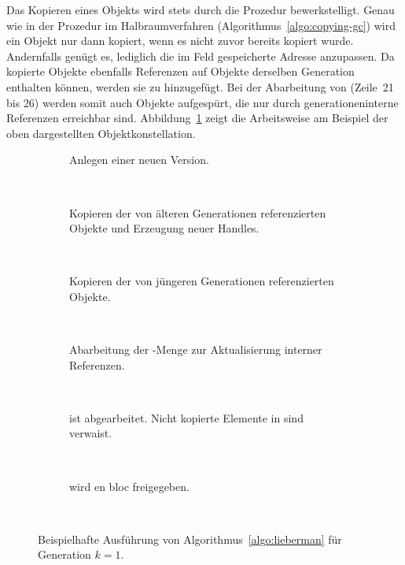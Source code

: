 Das Kopieren eines Objekts wird stets durch die Prozedur  bewerkstelligt.
Genau wie in der Prozedur  im Halbraumverfahren (Algorithmus~\ref{algo:copying-gc}) wird ein Objekt nur dann kopiert, wenn es nicht zuvor bereits kopiert wurde.
Andernfalls genügt es, lediglich die im Feld gespeicherte Adresse anzupassen.
Da kopierte Objekte ebenfalls Referenzen auf Objekte derselben Generation enthalten können, werden sie zu  hinzugefügt.
Bei der Abarbeitung von  (Zeile~21 bis 26) werden somit auch Objekte aufgespürt, die nur durch generationeninterne Referenzen erreichbar sind.
Abbildung~\ref{fig:lieberman-example} zeigt die Arbeitsweise am Beispiel der oben dargestellten Objektkonstellation.

\newpage

\begin{figure}[H] \newcommand{\liebermanscale}{0.75} \newcommand{\liebermanspace}{1cm}
	\centering
	\begin{subfigure}[t]{0.45\textwidth}
		\centering
		
		\caption{Anlegen einer neuen Version.}
	\end{subfigure}~\hspace{\liebermanspace}~
	\begin{subfigure}[t]{0.45\textwidth}
		\centering
		
		\caption{Kopieren der von älteren Generationen referenzierten Objekte und Erzeugung neuer Handles.}
	\end{subfigure}\\[1cm]
	\begin{subfigure}[t]{0.45\textwidth}
		\centering
		
		\caption{Kopieren der von jüngeren Generationen referenzierten Objekte.}
	\end{subfigure}~\hspace{\liebermanspace}~
	\begin{subfigure}[t]{0.45\textwidth}
		\centering
		
		\caption{Abarbeitung der -Menge zur Aktualisierung interner Referenzen.}
	\end{subfigure}\\[1cm]
	\begin{subfigure}[t]{0.45\textwidth}
		\centering
		
		\caption{ ist abgearbeitet. Nicht kopierte Elemente in  sind verwaist.}
	\end{subfigure}~\hspace{\liebermanspace}~
	\begin{subfigure}[t]{0.45\textwidth}
		\centering
		
		\caption{ wird en bloc freigegeben.}
	\end{subfigure}\\[0.5cm]
	\caption[Beispielhafte Ausführung von Algorithmus~\ref{algo:lieberman}]{Beispielhafte Ausführung von Algorithmus~\ref{algo:lieberman} für Generation $k = 1$.}
	\label{fig:lieberman-example}
\end{figure}

